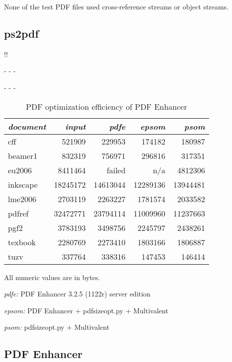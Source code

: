 \documentclass{ltugproc}
\def\cmd{\textsf}
\def\captiontop#1{%
  \advance\abovecaptionskip-\belowcaptionskip
  \advance\belowcaptionskip\abovecaptionskip
  \advance\abovecaptionskip-\belowcaptionskip
  \abovecaptionskip-\abovecaptionskip
  \caption{#1}%
  \advance\abovecaptionskip-\belowcaptionskip
  \advance\belowcaptionskip\abovecaptionskip
  \advance\abovecaptionskip-\belowcaptionskip
  \abovecaptionskip-\abovecaptionskip
}
\begin{document}
\noindent None of the test PDF files used cross-reference streams or object streams.

\subsection{ps2pdf}

!!

\begin{table}
\captiontop{PDF optimization efficiency
of PDF Enhancer}\label{tab:eff-pdfe}
\par\small\noindent\hfil
\advance\tabcolsep-2pt  %
\begin{tabular}{@{}lrrrr@{}}
\toprule
\emph{document} & \emph{input} & \emph{pdfe} & \emph{epsom} & \emph{psom} \\\midrule
cff         &   521909 &   229953 &   174182 &   180987 \\
beamer1     &   832319 &   756971 &   296816 &   317351 \\
eu2006      &  8411464 &  failed  & n/a      &  4812306 \\
inkscape    & 18245172 & 14613044 & 12289136 & 13944481 \\
lme2006     &  2703119 &  2263227 &  1781574 &  2033582 \\
pdfref      & 32472771 & 23794114 & 11009960 & 11237663 \\
pgf2        &  3783193 &  3498756 &  2245797 &  2438261 \\
texbook     &  2280769 &  2273410 &  1803166 &  1806887 \\
tuzv        &   337764 &   338316 &   147453 &   146414 \\
\bottomrule
\end{tabular}
\par\bigskip
\par\noindent All numeric values are in bytes.
\par\noindent\emph{pdfe:} PDF Enhancer 3.2.5 (1122r) server edition
\par\noindent\emph{epsom:} PDF Enhancer $+$ \cmd{pdfsizeopt.py} $+$ Multivalent
\par\noindent\emph{psom:} \cmd{pdfsizeopt.py} $+$ Multivalent
\end{table}


\subsection{PDF Enhancer}
\end{document}
